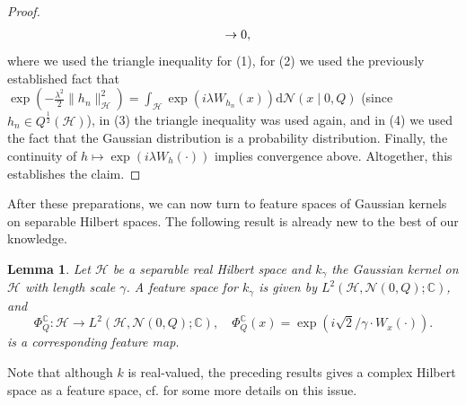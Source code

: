 \documentclass[letterpaper]{article} %
\newcommand{\fm}{\Phi} %
\newcommand{\hs}[1]{\mathcal{#1}} %
\newcommand{\Normal}{\mathcal{N}}
\newcommand{\C}{\mathbb{C}}
\newcommand{\stpx}[1]{{(#1)}}
\newtheorem{lemma}[theorem]{Lemma}
\begin{document}
\begin{proof}
\begin{align*}
        & \hspace{0.5cm} \rightarrow 0,
    \end{align*}
    where we used the triangle inequality for \stpx{1},
    for \stpx{2} we used the previously established fact that $\exp\left(-\frac{\lambda^2}{2}\|h_n\|_\hs{H}^2\right) = \int_\hs{H} \exp(i\lambda W_{h_n}(x))\mathrm{d}\Normal(x\mid 0, Q)$ (since $h_n\in Q^{\frac12}(\hs{H})$),
    in \stpx{3} the triangle inequality was used again,
    and in \stpx{4} we used the fact that the Gaussian distribution is a probability distribution.
    Finally, the continuity of $h \mapsto \exp(i\lambda W_h(\cdot))$ implies convergence above.
    Altogether, this establishes the claim.
\end{proof}
After these preparations, we can now turn to feature spaces of Gaussian kernels on separable Hilbert spaces.
The following result is already new to the best of our knowledge.
\begin{lemma} \label{lem:distrslt:complexFeatureSpaceForGaussianKernel}
    Let $\hs{H}$ be a separable real Hilbert space and $k_\gamma$ the Gaussian kernel on $\hs{H}$ with length scale $\gamma$.
    A feature space for $k_\gamma$ is given by $L^2(\hs{H},\Normal(0,Q);\C)$, and 
    \begin{equation}
        \fm_Q^\C: \hs{H}\rightarrow L^2(\hs{H},\Normal(0,Q);\C),
        \quad
        \fm_Q^\C(x) = \exp(i \sqrt{2}/\gamma \cdot W_x(\cdot)).
    \end{equation}
    is a corresponding feature map.
\end{lemma}
Note that although $k$ is real-valued, the preceding results gives a complex Hilbert space as a feature space, cf. \cite[Section~4.1]{SC08} for some more details on this issue.
\end{document}
